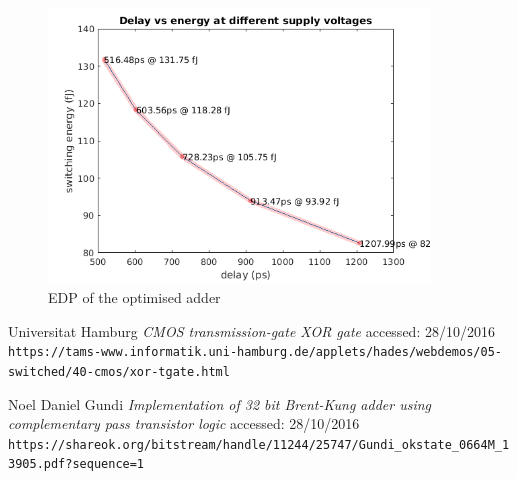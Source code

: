 \documentclass[english]{article}
\begin{document}
\begin{figure}[H]
\begin{centering}
\includegraphics[width=0.9\textwidth]{figures/EDPlabeled.png}
\par\end{centering}
\caption{EDP of the optimised adder}
\label{adderSchematic}
\end{figure}

\medskip

\begin{thebibliography}{9}

Universitat Hamburg
\textit{CMOS transmission-gate XOR gate}
accessed: 28/10/2016
\\\texttt{https://tams-www.informatik.uni-hamburg.de/applets/hades/webdemos/05-switched/40-cmos/xor-tgate.html}

Noel Daniel Gundi
\textit{Implementation of 32 bit Brent-Kung adder using complementary pass transistor logic}
accessed: 28/10/2016
\\\texttt{https://shareok.org/bitstream/handle/11244/25747/Gundi\_okstate\_0664M\_13905.pdf?sequence=1}

\end{thebibliography}
 
\end{document}
